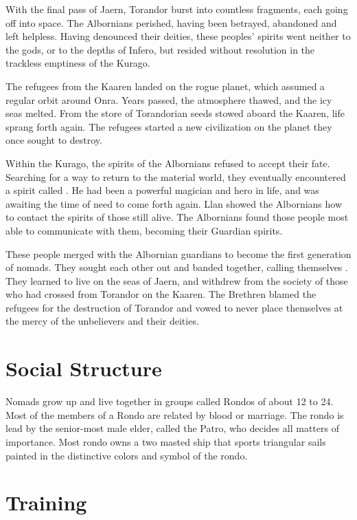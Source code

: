 \begin{multicols*}{2}
With the final pass of Jaern, Torandor burst into countless fragments, each going off into space. The Albornians perished, having been betrayed, abandoned and left helpless. Having denounced their deities, these peoples' spirits went neither to the gods, or to the depths of Infero, but resided without resolution in the trackless emptiness of the Kurago.

The refugees from the Kaaren landed on the rogue planet, which assumed a regular orbit around Onra. Years passed, the atmosphere thawed, and the icy seas melted. From the store of Torandorian seeds stowed aboard the Kaaren, life sprang forth again. The refugees started a new civilization on the planet they once sought to destroy.

Within the Kurago, the spirits of the Albornians refused to accept their fate. Searching for a way to return to the material world, they eventually encountered a spirit called . He had been a powerful magician and hero in life, and was awaiting the time of need to come forth again. Llan showed the Albornians how to contact the spirits of those still alive. The Albornians found those people most able to communicate with them, becoming their Guardian spirits.

These people merged with the Albornian guardians to become the first generation of nomads. They sought each other out and banded together, calling themselves . They learned to live on the seas of Jaern, and withdrew from the society of those who had crossed from Torandor on the Kaaren. The Brethren blamed the refugees for the destruction of Torandor and vowed to never place themselves at the mercy of the unbelievers and their deities.

\section{Social Structure}

Nomads grow up and live together in groups called Rondos of about 12 to 24. Most of the members of a Rondo are related by blood or marriage. The rondo is lead by the senior-most male elder, called the Patro, who decides all matters of importance. Most rondo owns a two masted ship that sports triangular sails painted in the distinctive colors and symbol of the rondo.

\section{Training}


\end{multicols*}
